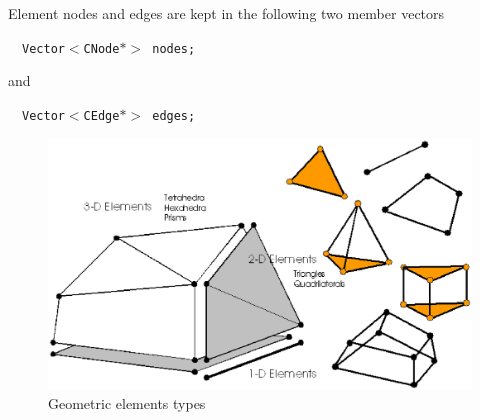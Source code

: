 Element nodes and edges are kept in the following two member vectors

\texttt{$\quad$Vector$<${}CNode$\ast>${}\ nodes;} 

and

\texttt{$\quad$Vector$<${}CEdge$\ast>${}\ edges;}


\begin{figure}[htb!]
\centering
\includegraphics[scale=0.55]{figures/elements.eps}
\caption{Geometric elements types} \label{fig:ele_types}
\end{figure}

